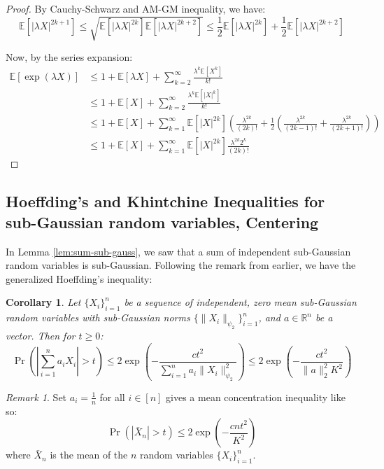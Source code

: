 \documentclass{article}
\newtheorem{corollary}{Corollary}[subsection]
\theoremstyle{remark}
\newtheorem*{remark}{Remark}
\newcommand{\real}{\mathbb{R}}
\newcommand{\Exp}{\mathbb{E}}
\begin{document}
\begin{proof}
By Cauchy-Schwarz and AM-GM inequality, we have:
\begin{equation*}
\Exp[|\lambda X|^{2k + 1}] \leq \sqrt{\Exp[|\lambda X|^{2k}] \Exp[|\lambda X|^{2k + 2}]} \leq \frac{1}{2}\Exp[|\lambda X|^{2k}] + \frac{1}{2}\Exp[|\lambda X|^{2k + 2}]
\end{equation*}

Now, by the series expansion:
\begin{align*}
\Exp[\exp(\lambda X)] &\leq 1 + \Exp[\lambda X] + \sum_{k=2}^{\infty} \frac{\lambda^{k} \Exp[X^{k}]}{k!} \\
&\leq 1 + \Exp[X] + \sum_{k=2}^{\infty} \frac{\lambda^{k} \Exp[|X|^{k}]}{k!} \\
&\leq 1 + \Exp[X] + \sum_{k=1}^{\infty} \Exp[|X|^{2k}]\left(\frac{\lambda^{2k}}{(2k)!} + \frac{1}{2}\left(\frac{\lambda^{2k}}{(2k - 1)!} + \frac{\lambda^{2k}}{(2k + 1)!}\right)\right) \\
&\leq 1 + \Exp[X] + \sum_{k=1}^{\infty} \Exp[|X|^{2k}]\frac{\lambda^{2k}2^{k}}{(2k)!}
\end{align*}
\end{proof}

\subsection{Hoeffding's and Khintchine Inequalities for sub-Gaussian random variables, Centering}
In Lemma \ref{lem:sum-sub-gauss}, we saw that a sum of independent sub-Gaussian random variables is sub-Gaussian. Following the remark from earlier, we have the generalized Hoeffding's inequality:
\begin{corollary}
\label{cor:hoeffding-sub-gaussian}
Let \(\{X_{i}\}_{i=1}^{n}\) be a sequence of independent, zero mean sub-Gaussian random variables with sub-Gaussian norms \(\{\|X_{i}\|_{\psi_{2}}\}_{i=1}^{n}\), and \(a \in \real^{n}\) be a vector. Then for \(t \geq 0\):
\begin{equation*}
\Pr\left(\left|\sum_{i=1}^{n} a_{i}X_{i}\right| > t\right) \leq 2\exp\left(-\frac{ct^{2}}{\sum\limits_{i=1}^{n}a_{i}\|X_{i}\|_{\psi_{2}}^{2}}\right) \leq 2\exp\left(-\frac{ct^{2}}{\|a\|_{2}^{2}K^{2}}\right)
\end{equation*}
\end{corollary}

\begin{remark}
Set \(a_{i} = \frac{1}{n}\) for all \(i \in [n]\) gives a mean concentration inequality like so:
\begin{equation*}
\Pr\left(|\bar{X}_{n}| > t\right) \leq 2\exp\left(-\frac{cnt^{2}}{K^{2}}\right)
\end{equation*}
where \(\bar{X}_{n}\) is the mean of the \(n\) random variables \(\{X_{i}\}_{i=1}^{n}\).
\end{remark}
\end{document}
